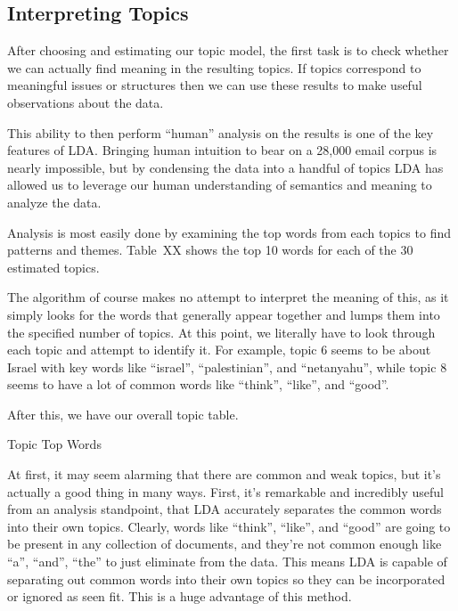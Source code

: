 \documentclass[12pt]{article}
\theoremstyle{definition}
\theoremstyle{algodesc}
\begin{document}
\subsection{Interpreting Topics}

After choosing and estimating our topic model, the first task is to check whether we can actually find meaning in the resulting topics. If topics correspond to meaningful issues or structures then we can use these results to make useful observations about the data.

This ability to then perform ``human'' analysis on the results is one of the key features of LDA. Bringing human intuition to bear on a 28,000 email corpus is nearly impossible, but by condensing the data into a handful of topics LDA has allowed us to leverage our human understanding of semantics and meaning to analyze the data.

Analysis is most easily done by examining the top words from each topics to find patterns and themes. Table~XX shows the top 10 words for each of the 30 estimated topics.

The algorithm of course makes no attempt to interpret the meaning of this, as it simply looks for the words that generally appear together and lumps them into the specified number of topics.  At this point, we literally have to look through each topic and attempt to identify it.  For example, topic 6 seems to be about Israel with key words like ``israel'', ``palestinian'', and ``netanyahu'', while topic 8 seems to have a lot of common words like ``think'', ``like'', and ``good''.

After this, we have our overall topic table.

\begin{table}[htb] \centering \scriptsize

\caption{Topic Top Words}
\label{tab:top_words}
\end{table}

At first, it may seem alarming that there are common and weak topics, but it's actually a good thing in many ways.  First, it's remarkable and incredibly useful from an analysis standpoint, that LDA accurately separates the common words into their own topics.  Clearly, words like ``think'', ``like'', and ``good'' are going to be present in any collection of documents, and they're not common enough like ``a'', ``and'', ``the'' to just eliminate from the data.  This means LDA is capable of separating out common words into their own topics so they can be incorporated or ignored as seen fit.  This is a huge advantage of this method.
\end{document}
